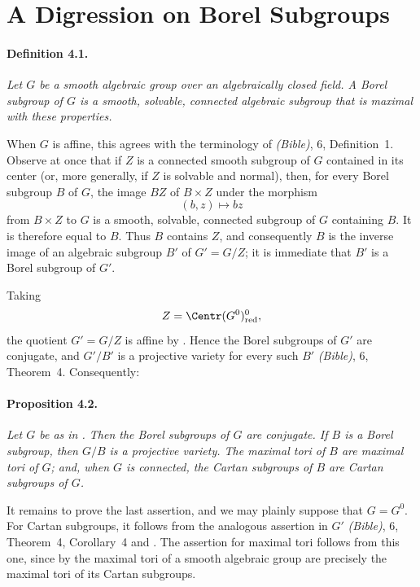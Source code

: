 
\section{A Digression on Borel Subgroups}

\paragraph{\textbf{Definition 4.1.}}
{\itshape Let \(G\) be a smooth algebraic group over an algebraically
closed field. A \emph{Borel subgroup} of \(G\) is a smooth, solvable,
connected algebraic subgroup that is maximal with these properties.}

When \(G\) is affine, this agrees with the terminology of
\textup{\emph{(Bible)}, 6, Definition~1}. Observe at once that if
\(Z\) is a connected smooth subgroup of \(G\) contained in its center
\textup{(or, more generally, if \(Z\) is solvable and normal)}, then,
for every Borel subgroup \(B\) of \(G\), the image \(BZ\) of
\(B\times Z\) under the morphism
\[
  (b,z)\longmapsto bz
\]
from \(B\times Z\) to \(G\) is a smooth, solvable, connected subgroup
of \(G\) containing \(B\). It is therefore equal to \(B\). Thus \(B\)
contains \(Z\), and consequently \(B\) is the inverse image of an
algebraic subgroup \(B'\) of \(G'=G/Z\); it is immediate that \(B'\)
is a Borel subgroup of \(G'\).

Taking
\[
  Z=\Centr(G^0)_{\mathrm{red}}^0,
\]
the quotient \(G'=G/Z\) is affine by . Hence the Borel
subgroups of \(G'\) are conjugate, and \(G'/B'\) is a projective
variety for every such \(B'\)
\textup{\emph{(Bible)}, 6, Theorem~4}. Consequently:

\paragraph{\textbf{Proposition 4.2.}}
{\itshape Let \(G\) be as in . Then the Borel subgroups of \(G\)
are conjugate. If \(B\) is a Borel subgroup, then \(G/B\) is a
projective variety. The maximal tori of \(B\) are maximal tori of
\(G\); and, when \(G\) is connected, the Cartan subgroups of \(B\)
are Cartan subgroups of \(G\).}

It remains to prove the last assertion, and we may plainly suppose
that \(G=G^0\). For Cartan subgroups, it follows from the analogous
assertion in \(G'\)
\textup{\emph{(Bible)}, 6, Theorem~4, Corollary~4}
and \textup{}. The assertion for maximal tori follows from
this one, since by \textup{} the maximal tori of a smooth
algebraic group are precisely the maximal tori of its Cartan
subgroups.


